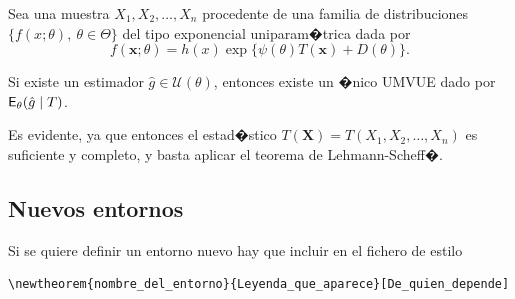 \documentclass[a4paper,12pt,%
]{memoir}
\begin{document}
\begin{corolario}
  Sea una muestra $X_{1},X_{2},\ldots,X_{n}$ procedente de una familia
  de distribuciones $\{f(x;\theta ),~ \theta \in \Theta \}$ del tipo
  exponencial uniparam�trica dada por
  \[
  f(\boldsymbol{x};\theta ) = h(x) \exp\{\psi (\theta
  )T(\boldsymbol{x})+D(\theta )\}.
  \]
  \par
  Si existe un estimador $\hat{g} \in \mathcal{U}(\theta )$, entonces
  existe un �nico UMVUE dado por $\mathsf{E}_{\theta} \!\left ( \hat{g} \mid T \right )$.
\end{corolario}
\begin{demo}
  Es evidente, ya que entonces el estad�stico
  $T(\boldsymbol{X})=T(X_{1},X_{2},\ldots,X_{n})$ es suficiente y
  completo, y basta aplicar el teorema de Lehmann-Scheff�.
\end{demo}

\subsection{Nuevos entornos}
Si se quiere definir un entorno nuevo hay que incluir en el fichero de
estilo
\begin{verbatim}
\newtheorem{nombre_del_entorno}{Leyenda_que_aparece}[De_quien_depende]
\end{verbatim}
  
\end{document}

